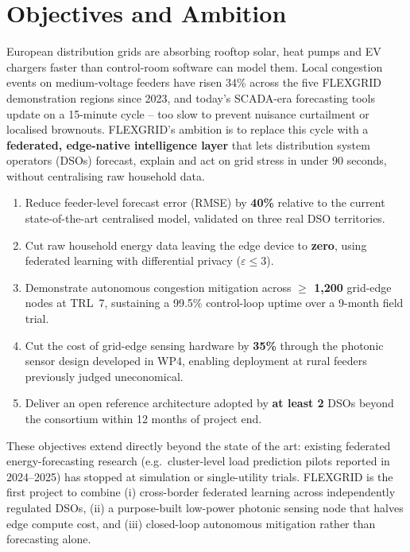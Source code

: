 \documentclass[11pt,a4paper,parskip=half]{scrreprt}
\begin{document}
\section{Objectives and Ambition}

European distribution grids are absorbing rooftop solar, heat pumps and EV chargers faster than
control-room software can model them. Local congestion events on medium-voltage feeders have
risen 34\% across the five FLEXGRID demonstration regions since 2023, and today's SCADA-era
forecasting tools update on a 15-minute cycle -- too slow to prevent nuisance curtailment or
localised brownouts. FLEXGRID's ambition is to replace this cycle with a \textbf{federated,
edge-native intelligence layer} that lets distribution system operators (DSOs) forecast, explain
and act on grid stress in under 90 seconds, without centralising raw household data.

\begin{tcolorbox}[objbox={\faIcon{lightbulb}\ \ Specific, Measurable Objectives}]
\begin{enumerate}[label=\textbf{O\arabic*.}]
  \item Reduce feeder-level forecast error (RMSE) by \textbf{40\%} relative to the current
        state-of-the-art centralised model, validated on three real DSO territories.
  \item Cut raw household energy data leaving the edge device to \textbf{zero}, using federated
        learning with differential privacy ($\varepsilon \leq 3$).
  \item Demonstrate autonomous congestion mitigation across \textbf{$\geq$ 1{,}200} grid-edge
        nodes at TRL~7, sustaining a 99.5\% control-loop uptime over a 9-month field trial.
  \item Cut the cost of grid-edge sensing hardware by \textbf{35\%} through the photonic sensor
        design developed in WP4, enabling deployment at rural feeders previously judged
        uneconomical.
  \item Deliver an open reference architecture adopted by \textbf{at least 2} DSOs beyond the
        consortium within 12 months of project end.
\end{enumerate}
\end{tcolorbox}

These objectives extend directly beyond the state of the art: existing federated energy-forecasting
research (e.g.\ cluster-level load prediction pilots reported in 2024--2025) has stopped at
simulation or single-utility trials. FLEXGRID is the first project to combine (i) cross-border
federated learning across independently regulated DSOs, (ii) a purpose-built low-power photonic
sensing node that halves edge compute cost, and (iii) closed-loop autonomous mitigation rather than
forecasting alone.
\end{document}
